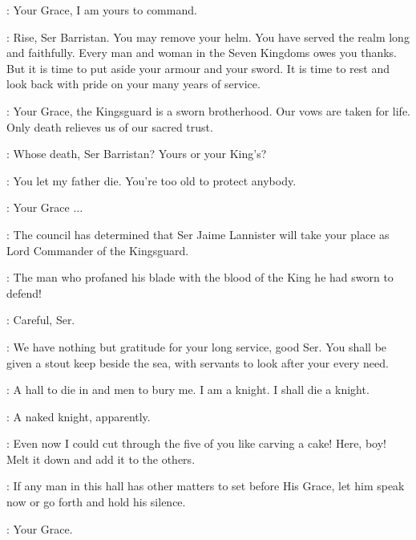 \SELMY: Your Grace, I am yours to command. 

\CERSEI: Rise, Ser Barristan. You may remove your helm.  You have served the realm long and faithfully. Every man and woman in the Seven Kingdoms owes you thanks. But it is time to put aside your armour and your sword. It is time to rest and look back with pride on your many years of service. 

\SELMY: Your Grace, the Kingsguard is a sworn brotherhood. Our vows are taken for life. Only death relieves us of our sacred trust. 

\CERSEI: Whose death, Ser Barristan? Yours or your King's? 

\JOFFREY: You let my father die. You're too old to protect anybody. 

\SELMY: Your Grace $\ldots$ 

\CERSEI: The council has determined that Ser Jaime Lannister will take your place as Lord Commander of the Kingsguard.  

\SELMY: The man who profaned his blade with the blood of the King he had sworn to defend! 

\CERSEI: Careful, Ser. 

\VARYS: We have nothing but gratitude for your long service, good Ser. You shall be given a stout keep beside the sea, with servants to look after your every need. 

\SELMY: A hall to die in and men to bury me.  I am a knight. I shall die a knight. 

\LITTLEFINGER: A naked knight, apparently.


\SELMY:  Even now I could cut through the five of you like carving a cake! Here, boy!  Melt it down and add it to the others. 

\HERALD: If any man in this hall has other matters to set before His Grace, let him speak now or go forth and hold his silence. 

\SANSA: Your Grace. 


